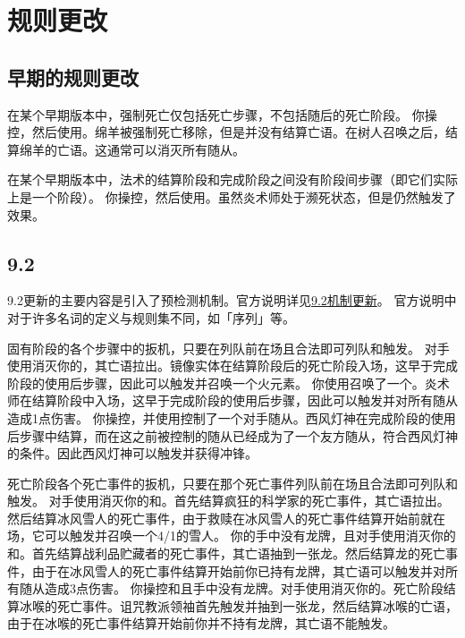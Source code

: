 \chapter{规则更改}
\label{rule-update}

\section{早期的规则更改}
\label{rule-update:early}

在某个早期版本中，强制死亡仅包括死亡步骤，不包括随后的死亡阶段。
\example 你操控，然后使用。绵羊被强制死亡移除，但是并没有结算亡语。在树人召唤之后，结算绵羊的亡语。这通常可以消灭所有随从。

在某个早期版本中，法术的结算阶段和完成阶段之间没有阶段间步骤（即它们实际上是一个阶段）。
\example 你操控，然后使用。虽然炎术师处于濒死状态，但是仍然触发了效果。

\section{9.2}
\label{rule-update:9.2}

9.2更新的主要内容是引入了预检测机制。官方说明详见\href{https://hs.blizzard.cn/article/16/11199}{9.2机制更新}。
\notice 官方说明中对于许多名词的定义与规则集不同，如「序列」等。

固有阶段的各个步骤中的扳机，只要在列队前在场且合法即可列队和触发。
\example 对手使用消灭你的，其亡语拉出。镜像实体在结算阶段后的死亡阶段入场，这早于完成阶段的使用后步骤，因此可以触发并召唤一个火元素。
\example 你使用召唤了一个。炎术师在结算阶段中入场，这早于完成阶段的使用后步骤，因此可以触发并对所有随从造成1点伤害。
\example 你操控，并使用控制了一个对手随从。西风灯神在完成阶段的使用后步骤中结算，而在这之前被控制的随从已经成为了一个友方随从，符合西风灯神的条件。因此西风灯神可以触发并获得冲锋。

死亡阶段各个死亡事件的扳机，只要在那个死亡事件列队前在场且合法即可列队和触发。
\example 对手使用消灭你的和。首先结算疯狂的科学家的死亡事件，其亡语拉出。然后结算冰风雪人的死亡事件，由于救赎在冰风雪人的死亡事件结算开始前就在场，它可以触发并召唤一个4/1的雪人。
\example 你的手中没有龙牌，且对手使用消灭你的和。首先结算战利品贮藏者的死亡事件，其亡语抽到一张龙。然后结算龙的死亡事件，由于在冰风雪人的死亡事件结算开始前你已持有龙牌，其亡语可以触发并对所有随从造成3点伤害。
\example 你操控和且手中没有龙牌。对手使用消灭你的。死亡阶段结算冰喉的死亡事件。诅咒教派领袖首先触发并抽到一张龙，然后结算冰喉的亡语，由于在冰喉的死亡事件结算开始前你并不持有龙牌，其亡语不能触发。

